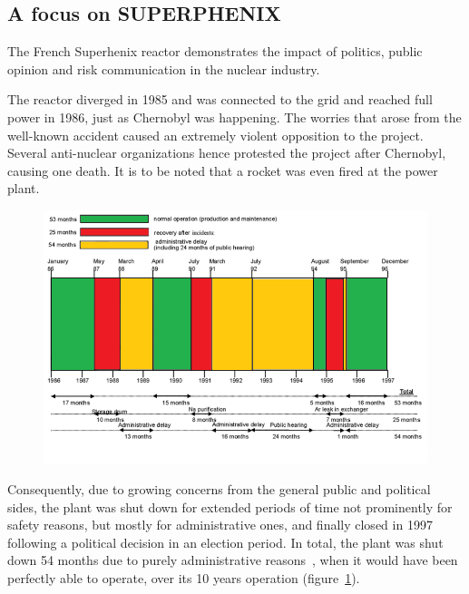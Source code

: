 \subsection{A focus on SUPERPHENIX}
\label{subsec1:superphenix}

The French Superhenix reactor demonstrates the impact of politics, public opinion and risk communication in the nuclear industry.

The reactor diverged in 1985 and was connected to the grid and reached full power in 1986, just as Chernobyl was happening. The worries that arose from the well-known accident caused an extremely violent opposition to the project. Several anti-nuclear organizations hence protested the project after Chernobyl, causing one death. It is to be noted that a rocket was even fired at the power plant.

\begin{figure}[t!]
	\centering
	\includegraphics[height=0.35\textheight]{fig01/superphenix_timeline}
	\label{fig:c1f3}
\end{figure}

Consequently, due to growing concerns from the general public and political sides, the plant was shut down for extended periods of time not prominently for safety reasons, but mostly for administrative ones, and finally closed in 1997 following a political decision in an election period. In total, the plant was shut down 54 months due to purely administrative reasons~\cite{pris01}, when it would have been perfectly able to operate, over its 10 years operation (figure~\ref{fig:c1f3}).

